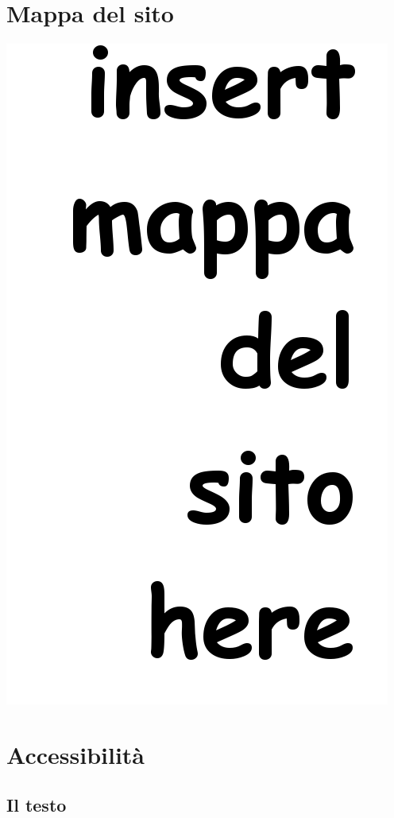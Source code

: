 \documentclass[10pt,a4paper,onecolumn]{article}
\begin{document}
\section{Mappa del sito}
\includegraphics[width=.9\textwidth]{mappasito.png}


\clearpage

\section{Accessibilità}\label{sec:accessibility}

\subsection{Il testo}\label{sec:testoaccessibile}
\end{document}
